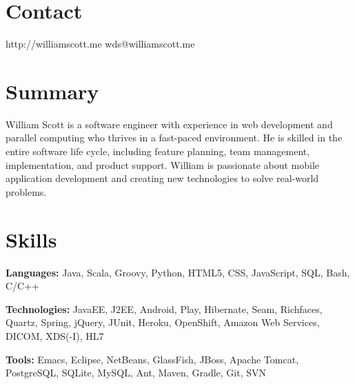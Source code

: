 \documentclass[margin,line]{resume}
\begin{document}
\begin{resume}
	\vspace{-4mm}


  \section{\mysidestyle \textcolor{mySideColor}{Contact}}

	http://williamscott.me \hfill wds@williamscott.me




  \section{\mysidestyle \textcolor{mySideColor}{Summary}}

  William Scott is a software engineer with experience in web
  development and parallel computing who thrives in a fast-paced
  environment. He is skilled in the entire software life cycle,
  including feature planning, team management, implementation, and
  product support. William is passionate about mobile application
  development and creating new technologies to solve real-world
  problems.


  \section{\mysidestyle \textcolor{mySideColor}{Skills}}

  \textbf{Languages:} Java, Scala, Groovy, Python, HTML5, CSS,
  JavaScript, SQL, Bash, C/C++
	\vspace{-2mm}

  \textbf{Technologies:} JavaEE, J2EE, Android, Play, Hibernate, Seam,
  Richfaces, Quartz, Spring, jQuery, JUnit, Heroku, OpenShift, Amazon
  Web Services, DICOM, XDS(-I), HL7
	\vspace{-2mm}

  \textbf{Tools:} Emacs, Eclipse, NetBeans, GlassFish, JBoss, Apache
  Tomcat, PostgreSQL, SQLite, MySQL, Ant, Maven, Gradle, Git, SVN
	\vspace{-2mm}


\end{resume}
\end{document}

